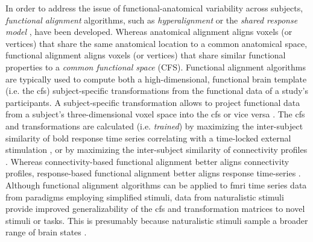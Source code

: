 %
%
In order to address the issue of functional-anatomical variability across
subjects, \textit{functional alignment} algorithms, such as
\textit{hyperalignment} \citep{haxby2011common, guntupalli2016model} or the
\textit{shared response model} \citep{chen2015reduced, zhang2016searchlight},
have been developed.
%
Whereas anatomical alignment aligns voxels (or vertices) that share the same
anatomical location to a common anatomical space, functional alignment aligns
voxels (or vertices) that share similar functional properties to a
\textit{common functional space} (CFS).
%
Functional alignment algorithms are typically used to compute both a
high-dimensional, functional brain template (i.e. the \ac{cfs}) subject-specific
transformations from the functional data of a study's participants.
%
A subject-specific transformation allows to project functional data from a
subject's three-dimensional voxel space into the \ac{cfs} or vice versa
\citep{haxby2020hyperalignment, kumar2020brainiak}.
%
The \ac{cfs} and transformations are calculated (i.e. \textit{trained}) by
maximizing the inter-subject similarity of \ac{bold} response time series
correlating with a time-locked external stimulation \citep{haxby2011common,
chen2015reduced, sabuncu2010function}, or by maximizing the inter-subject
similarity of connectivity profiles \citep{feilong2018reliable,
guntupalli2018computational, nastase2019leveraging}.
%
Whereas connectivity-based functional alignment better aligns connectivity
profiles, response-based functional alignment better aligns response time-series
\citep{guntupalli2018computational}.
%
Although functional alignment algorithms can be applied to \ac{fmri} time series
data from paradigms employing simplified stimuli, data from naturalistic stimuli
provide
%
improved generalizability of the \ac{cfs}
%
and transformation matrices
%
to novel stimuli or tasks.
%
This is presumably because naturalistic stimuli sample a broader range of brain
states \citep{haxby2011common, guntupalli2016model}.

